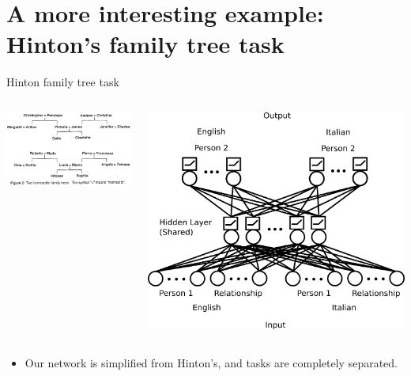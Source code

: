 \documentclass{beamer}
\begin{document}
\section{A more interesting example: Hinton's family tree task}
\begin{frame}{Hinton family tree task}
\begin{columns}
    \begin{center}
	\includegraphics[width = \textwidth]{../writing/cogsci_2017/figures/hinton_family_tree_figure.png}
    \end{center}
    \begin{center}
	\includegraphics[width = \textwidth]{../writing/cogsci_2017/figures/family_tree_network_diagram.png}
    \end{center}
\end{columns}
\begin{itemize}
\item Our network is simplified from Hinton's, and tasks are completely separated.
\end{itemize}
\end{frame}
\end{document}
